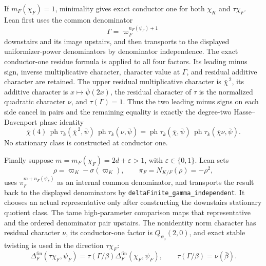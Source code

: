 \begin{theorem}
If $m_F(\chi_F)=1$, minimality gives exact conductor one for both
$\chi_K$ and $\tau\chi_F$.  Lean first uses the common denominator
\[
 \Gamma=\varpi_F^{n_F(\psi_F)+1}
\]
downstairs and its image upstairs, and then transports to the displayed
uniformizer-power denominators by denominator independence.  The exact
conductor-one residue formula is applied to all four factors.  Its leading
minus sign, inverse multiplicative character, character value at $\Gamma$,
and residual additive character are retained.  The upper residual
multiplicative character is $\bar\chi^{\,2}$, its additive character is
$x\mapsto\bar\psi(2x)$, the residual character of $\tau$ is the normalized
quadratic character $\nu$, and $\tau(\Gamma)=1$.  Thus the two leading
minus signs on each side cancel in pairs and the remaining equality is
exactly the degree-two Hasse--Davenport phase identity
\[
 \bar\chi(4)\,
 \operatorname{ph}\tau_k(\bar\chi^{\,2},\bar\psi)\,
 \operatorname{ph}\tau_k(\nu,\bar\psi)
 =
 \operatorname{ph}\tau_k(\bar\chi,\bar\psi)\,
 \operatorname{ph}\tau_k(\bar\chi\nu,\bar\psi).
\]
No stationary class is constructed at conductor one.

Finally suppose $m=m_F(\chi_F)=2d+\varepsilon>1$, with
$\varepsilon\in\{0,1\}$.  Lean sets
\[
 \rho=\varpi_K-\sigma(\varpi_K),\qquad
 \pi_F=N_{K/F}(\rho)=-\rho^2,
\]
uses $\pi_F^{m+n_F(\psi_F)}$ as an internal common denominator, and
transports the result back to the displayed denominators by
\texttt{deltaFinite\_gamma\_independent}.  It chooses an actual
representative only after constructing the downstairs stationary quotient
class.  The tame high-parameter comparison maps that representative and the
ordered denominator pair upstairs.  The nonidentity norm character has
residual character $\nu$, its conductor-one factor is
$Q_{\psi_0}(2,0)$, and exact stable twisting is used in the direction
$\tau\chi_F$:
\[
 \Delta_F^{\mathrm{fin}}(\tau\chi_F,\psi_F)
 =\tau(\Gamma/\beta)\Delta_F^{\mathrm{fin}}(\chi_F,\psi_F),
 \qquad
 \tau(\Gamma/\beta)=\nu(\bar\beta).
\]


\end{theorem}
